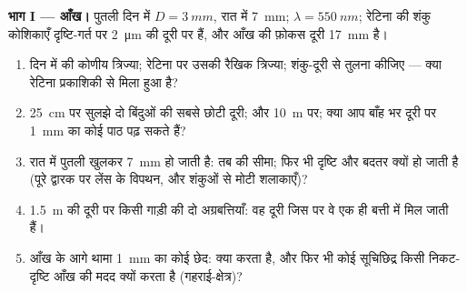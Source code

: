 \begin{problem}
\label{pb:b2:diffraction:1}

\medskip
\noindent\textbf{भाग I --- आँख।}
पुतली दिन में $D = \qty{3}{mm}$, रात में \qty{7}{mm}; $\lambda = \qty{550}{nm}$;
रेटिना की शंकु कोशिकाएँ दृष्टि-गर्त पर \qty{2}{\micro m} की दूरी पर हैं, और आँख की फ़ोकस
दूरी \qty{17}{mm} है।
\begin{enumerate}
  \item दिन में  की कोणीय त्रिज्या; रेटिना पर उसकी रैखिक
        त्रिज्या; शंकु-दूरी से तुलना कीजिए --- क्या रेटिना
        प्रकाशिकी से मिला हुआ है?
  \item \qty{25}{cm} पर सुलझे दो बिंदुओं की सबसे छोटी दूरी; और
        \qty{10}{m} पर; क्या आप बाँह भर दूरी पर \qty{1}{mm} का कोई पाठ पढ़ सकते हैं?
  \item रात में पुतली खुलकर \qty{7}{mm} हो जाती है: तब  की सीमा;
        फिर भी दृष्टि और बदतर क्यों हो जाती है (पूरे द्वारक पर लेंस के
        विपथन, और शंकुओं से मोटी शलाकाएँ)?
  \item \qty{1.5}{m} की दूरी पर किसी गाड़ी की दो अग्रबत्तियाँ: वह दूरी जिस पर वे
        एक ही बत्ती में मिल जाती हैं।
  \item आँख के आगे थामा \qty{1}{mm} का कोई छेद:  क्या करता है,
        और फिर भी कोई सूचिछिद्र किसी निकट-दृष्टि आँख की मदद क्यों करता है
        (गहराई-क्षेत्र)?
\end{enumerate}


\end{problem}
